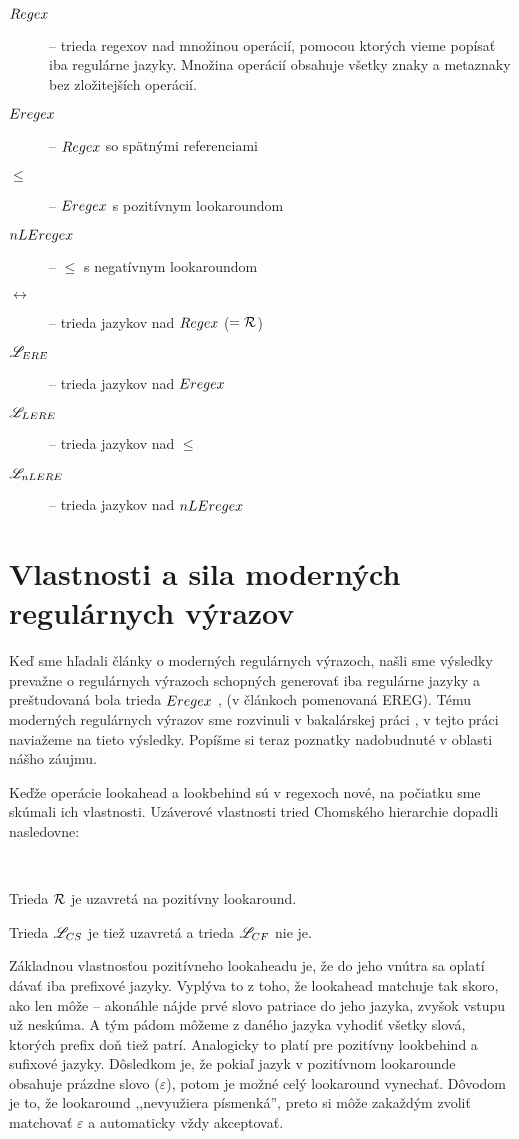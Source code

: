 \begin{description}
\item[$Regex$] -- trieda regexov nad množinou operácií, pomocou ktorých vieme popísať iba regulárne jazyky. Množina operácií obsahuje všetky znaky a metaznaky bez zložitejších operácií.
\item[$Eregex$] -- $Regex$ so spätnými referenciami
\item[$\le$] -- $Eregex$ s pozitívnym lookaroundom
\item[$nLEregex$] -- $\le$ s negatívnym lookaroundom
\item[$\rel$] -- trieda jazykov nad $Regex$ ($= {\cal R}$)
\item[$\mathscr{L}_{ERE}$] -- trieda jazykov nad $Eregex$
\item[$\mathscr{L}_{LERE}$] -- trieda jazykov nad $\le$
\item[$\mathscr{L}_{nLERE}$] -- trieda jazykov nad $nLEregex$
\end{description}

\section[Vlastnosti a sila]{Vlastnosti a sila moderných regulárnych výrazov}
\label{usila}

Keď sme hľadali články o moderných regulárnych výrazoch, našli sme výsledky prevažne o regulárnych výrazoch schopných generovať iba regulárne jazyky a preštudovaná bola trieda $Eregex$ \cite{ExtendedRegexPower}, \cite{ExtendedRegexIntersec} (v článkoch pomenovaná EREG). Tému moderných regulárnych výrazov sme rozvinuli v bakalárskej práci \cite{mojaBak}, v tejto práci naviažeme na tieto výsledky. Popíšme si teraz poznatky nadobudnuté v oblasti nášho záujmu.

Keďže operácie lookahead a lookbehind sú v regexoch nové, na počiatku sme skúmali ich vlastnosti. Uzáverové vlastnosti tried Chomského hierarchie dopadli nasledovne:
\begin{veta} \textbf{\emph{\cite[Veta 2.2.5.]{mojaBak}}}\label{lookahead+R} \ \par
Trieda ${\cal R}$ je uzavretá na pozitívny lookaround.
\end{veta}
Trieda $\mathscr{L}_{CS}$ je tiež uzavretá a trieda $\mathscr{L}_{CF}$ nie je.

Základnou vlastnosťou pozitívneho lookaheadu je, že do jeho vnútra sa oplatí dávať iba prefixové jazyky. Vyplýva to z toho, že lookahead matchuje tak skoro, ako len môže -- akonáhle nájde prvé slovo patriace do jeho jazyka, zvyšok vstupu už neskúma. A tým pádom môžeme z daného jazyka vyhodiť všetky slová, ktorých prefix doň tiež patrí. Analogicky to platí pre pozitívny lookbehind a sufixové jazyky. Dôsledkom je, že pokiaľ jazyk v pozitívnom lookarounde obsahuje prázdne slovo ($\varepsilon$), potom je možné celý lookaround vynechať. Dôvodom je to, že lookaround ,,nevyužiera písmenká'', preto si môže zakaždým zvoliť matchovať $\varepsilon$ a automaticky vždy akceptovať.

